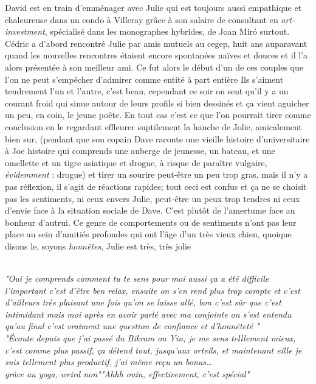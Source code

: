\begin{paracol}{2}
\begin{rightcolumn} David est en train d'emménager avec Julie qui est
            toujours aussi empathique et chaleureuse dans un condo à Villeray
	    grâce à son salaire de consultant en \textit{art-investment}, 
    spécialisé dans les monographes hybrides, de Joan Mir\'o surtout. Cédric a
    d'abord rencontré Julie par amis mutuels au cegep, huit ans auparavant
    quand les nouvelles rencontres étaient encore spontanées naïves et douces
    et il l'a alors présentée à son meilleur ami. Ce fut alors le début d'un de
    ces couples que l'on ne peut s'empêcher d'admirer comme entité à part entière
    Ils s'aiment tendrement l'un et l'autre, c'est beau, cependant ce soir on sent
    qu'il y a un courant froid qui sinue autour de leurs profils si
    bien dessinés et ça vient aguicher un peu, en coin, le jeune poête. En
    tout cas c'est ce que l'on pourrait tirer comme conclusion en le regardant
    effleurer suptilement la hanche de Jolie, amicalement bien sur, (pendant
    que son copain Dave raconte une vieille histoire d'universitaire à Joe histoire
    qui comprends une auberge de jeunesse, un bateau, et une omellette et un
    tigre asiatique et drogue, à risque de paraître vulgaire, \emph{évidemment}
    : drogue)
    et tirer un sourire peut-être un peu trop gras, mais il
    n'y a pas réflexion, il s'agit de réactions rapides; tout ceci est confus
    et ça ne se choisit pas les sentiments, ni ceux envers Julie, peut-être un
    peux trop tendres ni ceux d'envie face à la situation sociale de Dave.
    C'est plutôt de l'amertume face au bonheur d'autrui. Ce genre de comportements
    ou de sentiments n'ont pas leur place au sein d'amitiés profondes qui ont
    l'âge d'un très vieux chien, quoique disons le,
    soyons \emph{honnêtes}, Julie est très, très jolie \\
\end{rightcolumn}
\begin{leftcolumn} \phantom\\\vspace{5em}
 \phantom{}
\small
            \textit{"Oui je comprends comment tu te sens pour moi aussi ça a été
                difficile l'important c'est d'être ben relax, ensuite on s'en
                rend plus trop compte et c'est d'ailleurs très plaisant une fois
                qu'on se laisse allé, bon c'est sûr que c'est intimidant mais
        moi après en avoir parlé avec ma conjointe on s'est entendu qu'au final
c'est vraiment une question de confiance et d'honnêteté \textelp{}"}\\[10em]
\textit{"Écoute depuis que j'ai passé du Bikram ou Yin, je me sens telllement
	mieux, c'est comme plus passif, ça détend tout, jusqu'aux orteils, et
	maintenant eille je suis tellement plus productif, j'ai même reçu un
	bonus\ldots\\grâce au yoga, weird non""Ahhh ouin, effectivement, c'est
spécial"}
\end{leftcolumn}
\end{paracol}
